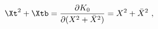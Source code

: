 \begin{equation}
\Xt^2+\Xtb={\partial K_0\over\partial (X^2+\bar{X}^2)}
=X^2+\bar{X}^2 \ ,
\end{equation}

